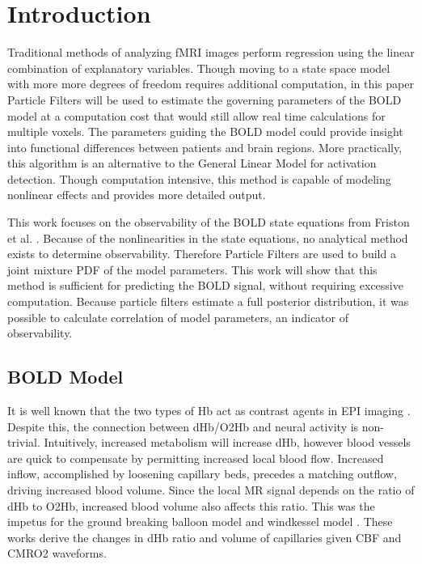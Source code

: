 \documentclass{article}
\begin{document}
\section{Introduction}
\label{sec:intro}
Traditional methods of analyzing 
\ac{fMRI} images perform regression using the linear combination of explanatory variables. 
Though moving to a state space model with more more degrees of freedom 
requires additional computation, in this paper Particle Filters will
be used to estimate the governing parameters of the \ac{BOLD} model 
at a computation cost 
that would still allow real time calculations for multiple voxels.
The parameters guiding the BOLD model could provide insight into 
functional differences between patients and brain regions.
More practically, this algorithm is an alternative to the General
Linear Model for activation detection. Though computation intensive,
this method is capable of modeling nonlinear effects
and provides more detailed output. 

This work focuses
on the observability of the \ac{BOLD} state equations from Friston et al.
\cite{Friston2000}. 
Because of the nonlinearities in the state equations,
no analytical method exists to determine observability. Therefore
Particle Filters are used to build a joint mixture \ac{PDF} of the model parameters. 
This work will show that this method is sufficient for predicting
the BOLD signal, without requiring excessive computation. 
Because particle filters estimate a full posterior distribution, 
it was possible to calculate correlation of model parameters, an
indicator of observability. 

\subsection{BOLD Model}
It is well known that the two types of \ac{Hb} act as contrast agents in 
\ac{EPI} imaging \cite{Buxton1998, WEISSKOFF1994, Ogawa}. Despite this, the connection
between \ac{dHb}/\ac{O2Hb} and neural activity is non-trivial. 
Intuitively, increased 
metabolism will increase \ac{dHb}, however blood vessels are quick
to compensate by permitting increased local blood flow. Increased inflow, accomplished by loosening 
capillary beds, precedes a matching outflow, driving increased 
blood volume.
Since the local \ac{MR} signal depends on the ratio of \ac{dHb} to \ac{O2Hb},
increased blood volume also affects this ratio. 
This was the impetus
for the ground breaking balloon model \cite{Buxton1998} and windkessel
model \cite{Mandeville1999}. These works derive 
the changes in \ac{dHb} ratio and volume of capillaries given \ac{CBF}
and \ac{CMRO2} waveforms.
\end{document}

